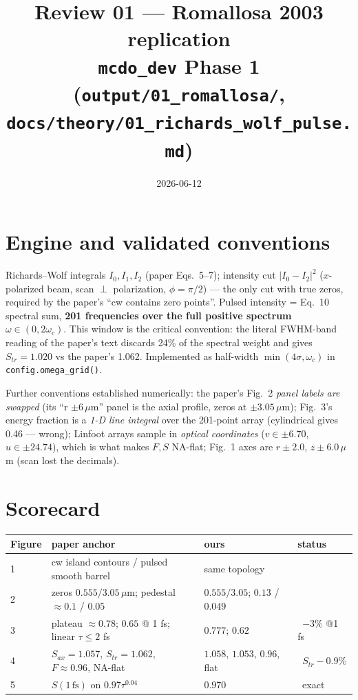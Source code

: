 \documentclass[10pt]{article}
\title{\vspace{-1.2cm}\textbf{Review 01 --- Romallosa 2003 replication}\\
\large \texttt{mcdo\_dev} Phase 1 \quad(\texttt{output/01\_romallosa/},
\texttt{docs/theory/01\_richards\_wolf\_pulse.md})}
\author{}
\date{2026-06-12}
\newcommand{\ok}{\textcolor{green!55!black}{\checkmark}}
\newcommand{\res}[1]{\textcolor{orange!80!black}{#1}}
\begin{document}
\maketitle
\vspace{-1.1cm}

\section*{Engine and validated conventions}

Richards--Wolf integrals $I_0,I_1,I_2$ (paper Eqs.~5--7); intensity cut
$|I_0-I_2|^2$ ($x$-polarized beam, scan $\perp$ polarization, $\phi=\pi/2$) ---
the only cut with true zeros, required by the paper's ``cw contains zero
points''. Pulsed intensity = Eq.~10 spectral sum, \textbf{201 frequencies over
the full positive spectrum $\omega\in(0,2\omega_c)$}. This window is the
critical convention: the literal FWHM-band reading of the paper's text discards
24\% of the spectral weight and gives $S_{tr}=1.020$ vs the paper's 1.062.
Implemented as half-width $\min(4\sigma,\omega_c)$ in \texttt{config.omega\_grid()}.

Further conventions established numerically:
the paper's Fig.~2 \emph{panel labels are swapped} (its ``r $\pm6\,\mu$m'' panel
is the axial profile, zeros at $\pm3.05\,\mu$m); Fig.~3's energy fraction is a
\emph{1-D line integral} over the 201-point array (cylindrical gives 0.46 ---
wrong); Linfoot arrays sample in \emph{optical coordinates}
($v\in\pm6.70$, $u\in\pm24.74$), which is what makes $F,S$ NA-flat;
Fig.~1 axes are $r\pm2.0$, $z\pm6.0\,\mu$m (scan lost the decimals).

\section*{Scorecard}

\begin{center}
\small
\begin{tabular}{llll}
\toprule
Figure & paper anchor & ours & status\\
\midrule
1 & cw island contours / pulsed smooth barrel & same topology & \ok\\
2 & zeros $0.555/3.05\,\mu$m; pedestal $\approx0.1$ / $0.05$ & $0.555/3.05$; $0.13$ / $0.049$ & \ok\\
3 & plateau $\approx0.78$; $0.65$ @ 1 fs; linear $\tau\le2$ fs & $0.777$; $0.62$ & \ok~\res{$-3\%$ @1 fs}\\
4 & $S_{ax}{=}1.057$, $S_{tr}{=}1.062$, $F{\approx}0.96$, NA-flat & $1.058$, $1.053$, $0.96$, flat & \ok~\res{$S_{tr}-0.9\%$}\\
5 & $S(1\,\mathrm{fs})$ on $0.97\tau^{0.04}$ & $0.970$ & \ok~exact\\
\bottomrule
\end{tabular}
\end{center}
\end{document}
